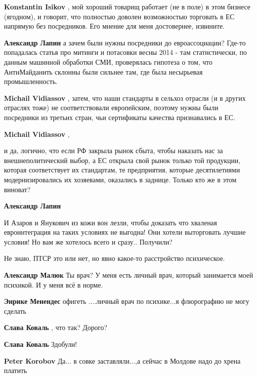 \begin{itemize}
\begin{itemize}
\textbf{Konstantin Isikov} , мой хороший товарищ работает (не в поле) в этом бизнесе (ягодном), и говорит, что полностью доволен возможностью торговать в ЕС напрямую без посредников. Его мнение для меня достовернее, извините.

\textbf{Александр Лапин} а зачем были нужны посредники до евроассоциации? Где-то попадалась статья про митинги и потасовки весны 2014 - там статистически, по данным машинной обработки СМИ, проверялась гипотеза о том, что АнтиМайданить склонны были сильнее там, где была несырьевая промышленность.

\textbf{Michail Vidiassov} , затем, что наши стандарты в сельхоз отрасли (и в других отраслях тоже) не соответствовали европейским, поэтому нужны были посредники из третьих стран, чьи сертификаты качества признавались в ЕС.

\textbf{Michail Vidiassov} , 

и да, логично, что если РФ закрыла рынок сбыта, чтобы наказать нас за
внешнеполитический выбор, а ЕС открыла свой рынок только той продукции, которая
соответствует их стандартам, те предприятия, которые десятилетиями
модернизировались их хозяевами, оказались в заднице. Только кто же в этом
виноват?

\textbf{Александр Лапин} 

И Азаров и Янукович из кожи вон лезли, чтобы доказать что хваленая
евроинтеграция на таких условиях не выгодна! Они хотели выторговать лучшие
условия! Но вам же хотелось всего и сразу.. Получили?

\end{itemize} %

Не знаю, ПТСР это или нет, но явно какое-то расстройство психическое.

\begin{itemize} %
\textbf{Александр Малюк} Ты врач? У меня есть личный врач, который занимается моей психикой. И у меня всё в норме.

\textbf{Энрике Менендес} офигеть ....личный врач по психике...я флюрографию не могу сделать

\textbf{Слава Коваль} , что так? Дорого?


\textbf{Слава Коваль} Здобули!

\textbf{Peter Korobov} Да... в совке заставляли...,а сейчас в Молдове надо до хрена платить


\end{itemize}
\end{itemize}
